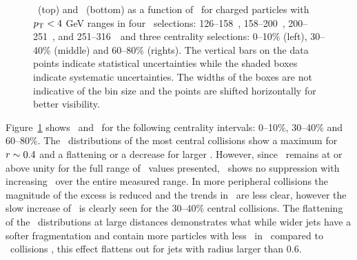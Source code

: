 \begin{figure}
{\begin{tabular}{ccc}
\end{tabular} }
\caption{\RTheta\ (top) and \RP\ (bottom) as a function of \rvar\ for charged particles with $\mbox{$p_{\mathrm{T}}$} < 4$ GeV ranges in four \ptjet\ selections: 126--158~\GeV, 158--200~\GeV, 200--251~\GeV, and 251--316~\GeV\ and three centrality selections: 0--10\% (left), 30--40\% (middle) and 60--80\% (rights).
The vertical bars on the data points indicate statistical uncertainties while the shaded boxes indicate systematic uncertainties.
The widths of the boxes are not indicative of the bin size and the points are shifted horizontally for better visibility.}
\label{fig:RPRT}
\end{figure}


Figure~\ref{fig:RPRT} shows \RTheta\ and \RP\ for the following centrality intervals: 0--10\%, 30--40\% and 60--80\%.
The \RTheta\ distributions of the most central collisions show a maximum for $\mbox{$r$} \sim 0.4$ and a flattening or a decrease for larger \rvar.
However, since \RTheta\ remains at or above unity for the full range of \rvar\ values presented, \RP\ shows no suppression with increasing \rvar\ over the entire measured range.
In more peripheral collisions the magnitude of the excess is reduced and the trends in \RTheta\ are less clear, however the slow increase of \RP\ is clearly seen for the 30--40\% central collisions.
The flattening of the \RP\ distributions at large distances demonstrates what while wider jets have a softer fragmentation and contain more particles with less \pt\ in \pbpb\ compared to \pp\ collisions \cite{Chesler:2015nqz, Hulcher:2017cpt}, this effect flattens out for jets with radius larger than 0.6.



\FloatBarrier

